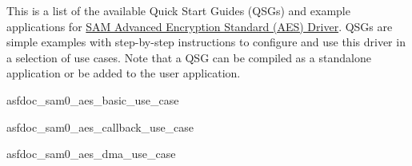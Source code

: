 This is a list of the available Quick Start Guides (Q\+S\+Gs) and example applications for \hyperlink{group__asfdoc__sam0__drivers__aes__group}{S\+A\+M Advanced Encryption Standard (A\+E\+S) Driver}. Q\+S\+Gs are simple examples with step-\/by-\/step instructions to configure and use this driver in a selection of use cases. Note that a Q\+S\+G can be compiled as a standalone application or be added to the user application.


\begin{DoxyItemize}
\item asfdoc\+\_\+sam0\+\_\+aes\+\_\+basic\+\_\+use\+\_\+case
\item asfdoc\+\_\+sam0\+\_\+aes\+\_\+callback\+\_\+use\+\_\+case
\item asfdoc\+\_\+sam0\+\_\+aes\+\_\+dma\+\_\+use\+\_\+case 
\end{DoxyItemize}